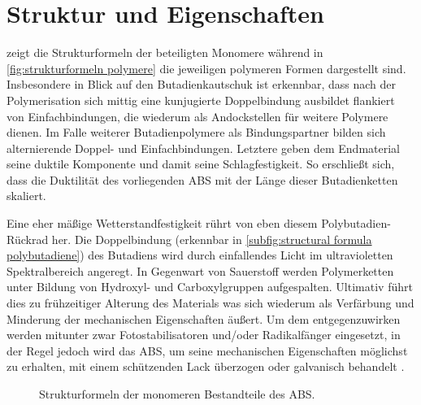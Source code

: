     \section{Struktur und Eigenschaften}
             zeigt die Strukturformeln der beteiligten Monomere während in \cref{fig:strukturformeln polymere}
            die jeweiligen polymeren Formen dargestellt sind. Insbesondere in Blick auf den Butadienkautschuk ist erkennbar,
            dass nach der Polymerisation sich mittig eine kunjugierte Doppelbindung ausbildet flankiert von Einfachbindungen,
            die wiederum als Andockstellen für weitere Polymere dienen. Im Falle weiterer Butadienpolymere als Bindungspartner
            bilden sich alternierende Doppel- und Einfachbindungen. Letztere geben dem Endmaterial seine duktile Komponente und
            damit seine Schlagfestigkeit. So erschließt sich, dass die Duktilität des vorliegenden ABS mit der Länge
            dieser Butadienketten skaliert.\par
            Eine eher mäßige Wetterstandfestigkeit rührt von eben diesem Polybutadien-Rückrad her. Die Doppelbindung (erkennbar
            in \cref{subfig:structural formula polybutadiene}) des
            Butadiens wird durch einfallendes Licht im ultravioletten Spektralbereich angeregt. In Gegenwart von Sauerstoff
            werden Polymerketten unter Bildung von Hydroxyl- und Carboxylgruppen aufgespalten. Ultimativ führt dies zu
            frühzeitiger Alterung des Materials was sich wiederum als Verfärbung und Minderung der mechanischen Eigenschaften äußert.
            Um dem entgegenzuwirken werden mitunter zwar Fotostabilisatoren und/oder Radikalfänger eingesetzt, in der 
            Regel jedoch wird das ABS, um seine mechanischen Eigenschaften möglichst zu erhalten, mit einem schützenden Lack
            überzogen oder galvanisch behandelt \cite{Thermal.and.Photo-Degradation.of.Unstabilized.ABS.Adeniyi.1984,Domininghaus.1998.Kunststoffe.und.ihre.Eigenschaften}.
            \begin{figure}[H]%
                \centering
                \qquad
                \qquad
                \caption[Strukturformeln der monomeren Bestandteile des ABS]{Strukturformeln der monomeren Bestandteile des ABS.}%
                \label{fig:strukturformeln_monomere}%
            \end{figure}
